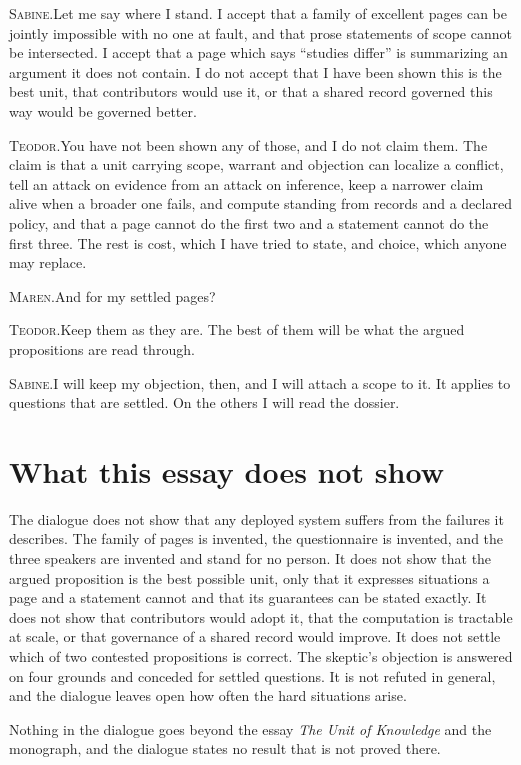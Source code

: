 \documentclass[11pt]{article}
\newcommand{\say}[2]{\par\noindent\textsc{#1.}\enspace #2\par}
\newcommand{\MA}[1]{\say{Maren}{#1}}
\newcommand{\TE}[1]{\say{Teodor}{#1}}
\newcommand{\SA}[1]{\say{Sabine}{#1}}
\begin{document}
\SA{Let me say where I stand. I accept that a family of excellent pages can be jointly impossible with no one at fault, and that prose statements of scope cannot be intersected. I accept that a page which says ``studies differ'' is summarizing an argument it does not contain. I do not accept that I have been shown this is the best unit, that contributors would use it, or that a shared record governed this way would be governed better.}

\TE{You have not been shown any of those, and I do not claim them. The claim is that a unit carrying scope, warrant and objection can localize a conflict, tell an attack on evidence from an attack on inference, keep a narrower claim alive when a broader one fails, and compute standing from records and a declared policy, and that a page cannot do the first two and a statement cannot do the first three. The rest is cost, which I have tried to state, and choice, which anyone may replace.}

\MA{And for my settled pages?}

\TE{Keep them as they are. The best of them will be what the argued propositions are read through.}

\SA{I will keep my objection, then, and I will attach a scope to it. It applies to questions that are settled. On the others I will read the dossier.}

\section{What this essay does not show}

The dialogue does not show that any deployed system suffers from the failures it describes. The family of pages is invented, the questionnaire is invented, and the three speakers are invented and stand for no person. It does not show that the argued proposition is the best possible unit, only that it expresses situations a page and a statement cannot and that its guarantees can be stated exactly. It does not show that contributors would adopt it, that the computation is tractable at scale, or that governance of a shared record would improve. It does not settle which of two contested propositions is correct. The skeptic's objection is answered on four grounds and conceded for settled questions. It is not refuted in general, and the dialogue leaves open how often the hard situations arise.

Nothing in the dialogue goes beyond the essay \emph{The Unit of Knowledge} and the monograph, and the dialogue states no result that is not proved there.
\end{document}
